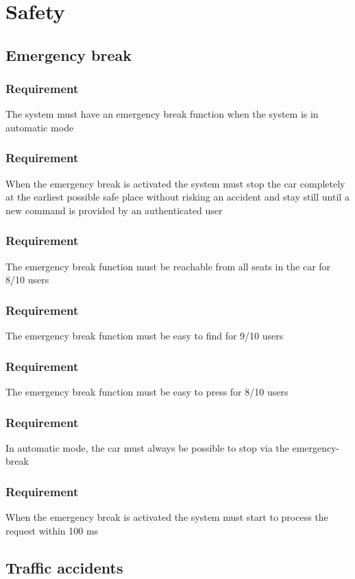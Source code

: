 \documentclass{article}
\begin{document}
\section{Safety}
  \subsection{Emergency break}
      \subsubsection{Requirement}
\hfill \break 
\- \- \-The system must have an emergency break function when the system is in automatic mode
      \subsubsection{Requirement}
\hfill \break 
\- \- \-When the emergency break is activated the system must stop the car completely at the earliest possible safe place without risking an accident and stay still until a new command is provided by an authenticated user
      \subsubsection{Requirement}
\hfill \break 
\- \- \-The emergency break function must be reachable from all seats in the car for 8/10 users
      \subsubsection{Requirement}
\hfill \break 
\- \- \-The emergency break function must be easy to find for 9/10 users
      \subsubsection{Requirement}
\hfill \break 
\- \- \-The emergency break function must be easy to press for 8/10 users
      \subsubsection{Requirement}
\hfill \break 
\- \- \-In automatic mode, the car must always be possible to stop via the emergency-break
      \subsubsection{Requirement}
\hfill \break 
\- \- \-When the emergency break is activated the system must start to process the request within 100 ms
  \subsection{Traffic accidents}
\end{document}

